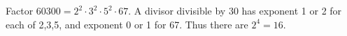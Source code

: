Factor $ 60300=2^2\cdot3^2\cdot5^2\cdot67 $. A divisor divisible by 30 has exponent 1 or 2 for each of 2,3,5, and exponent 0 or 1 for 67. Thus there are $ 2^4=\boxed{16}$.
